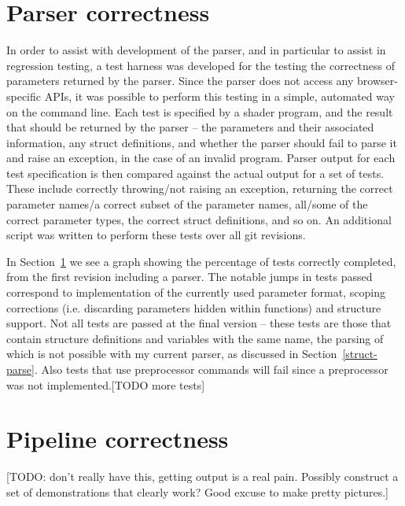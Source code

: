\documentclass[12pt,twoside,notitlepage]{report}
\begin{document}
\section{Parser correctness}
In order to assist with development of the parser, and in particular to assist in regression testing, a test harness was developed for the testing the correctness of parameters returned by the parser. Since the parser does not access any browser-specific APIs, it was possible to perform this testing in a simple, automated way on the command line. Each test is specified by a shader program, and the result that should be returned by the parser -- the parameters and their associated information, any struct definitions, and whether the parser should fail to parse it and raise an exception, in the case of an invalid program. Parser output for each test specification is then compared against the actual output for a set of tests. These include correctly throwing/not raising an exception, returning the correct parameter names/a correct subset of the parameter names, all/some of the correct parameter types, the correct struct definitions, and so on. An additional script was written to perform these tests over all git revisions. 

In Section~\ref{parser-git} we see a graph showing the percentage of tests correctly completed, from the first revision including a parser. The notable jumps in tests passed correspond to implementation of the currently used parameter format, scoping corrections (i.e. discarding parameters hidden within functions) and structure support. Not all tests are passed at the final version -- these tests are those that contain structure definitions and variables with the same name, the parsing of which is not possible with my current parser, as discussed in Section~\ref{struct-parse}. Also tests that use preprocessor commands will fail since a preprocessor was not implemented.[TODO more tests]

\begin{figure}
\label{parser-git}
\end{figure}

\section{Pipeline correctness}
[TODO: don't really have this, getting output is a real pain. Possibly construct a set of demonstrations that clearly work? Good excuse to make pretty pictures.]
\end{document}
